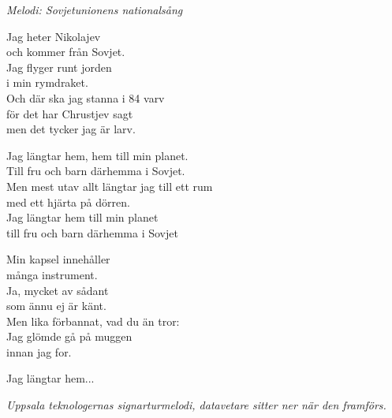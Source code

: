 {\footnotesize\textit{Melodi: Sovjetunionens nationalsång}}\par
\vspace{10pt}
Jag heter Nikolajev\\
och kommer från Sovjet.\\
Jag flyger runt jorden\\
i min rymdraket.\\
Och där ska jag stanna i 84 varv\\
för det har Chrustjev sagt\\
men det tycker jag är larv.\par
\vspace{10pt}
Jag längtar hem, hem till min planet.\\
Till fru och barn därhemma i Sovjet.\\
Men mest utav allt längtar jag till ett rum\\
med ett hjärta på dörren.\\
Jag längtar hem till min planet\\
till fru och barn därhemma i Sovjet\par
\vspace{10pt}
Min kapsel innehåller\\
många instrument.\\
Ja, mycket av sådant\\
som ännu ej är känt.\\
Men lika förbannat, vad du än tror:\\
Jag glömde gå på muggen\\
innan jag for.\par
\vspace{10pt}
Jag längtar hem...
\par
\vspace{10pt}
{\footnotesize\textit{Uppsala teknologernas signarturmelodi, datavetare sitter ner när den framförs.}}
